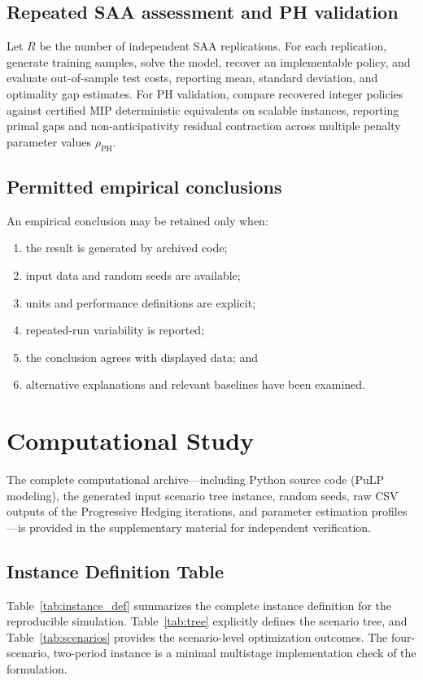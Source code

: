 \documentclass[11pt,a4paper]{article}
\begin{document}
\subsection{Repeated SAA assessment and PH validation}

Let \(R\) be the number of independent SAA replications. For each
replication, generate training samples, solve the model, recover an
implementable policy, and evaluate out-of-sample test costs, reporting
mean, standard deviation, and optimality gap estimates. For PH
validation, compare recovered integer policies against certified MIP
deterministic equivalents on scalable instances, reporting primal gaps
and non-anticipativity residual contraction across multiple penalty
parameter values \(\rho_{\mathrm{PH}}\).

\subsection{Permitted empirical conclusions}

An empirical conclusion may be retained only when:
\begin{enumerate}
  \item the result is generated by archived code;
  \item input data and random seeds are available;
  \item units and performance definitions are explicit;
  \item repeated-run variability is reported;
  \item the conclusion agrees with displayed data; and
  \item alternative explanations and relevant baselines have been
  examined.
\end{enumerate}

\section{Computational Study}

The complete computational archive---including Python source code (PuLP modeling), the generated input scenario tree instance, random seeds, raw CSV outputs of the Progressive Hedging iterations, and parameter estimation profiles---is provided in the supplementary material for independent verification.

\subsection{Instance Definition Table}
Table~\ref{tab:instance_def} summarizes the complete instance definition for the reproducible simulation. Table~\ref{tab:tree} explicitly defines the scenario tree, and Table~\ref{tab:scenarios} provides the scenario-level optimization outcomes. The four-scenario, two-period instance is a minimal multistage implementation check of the formulation.
\end{document}
